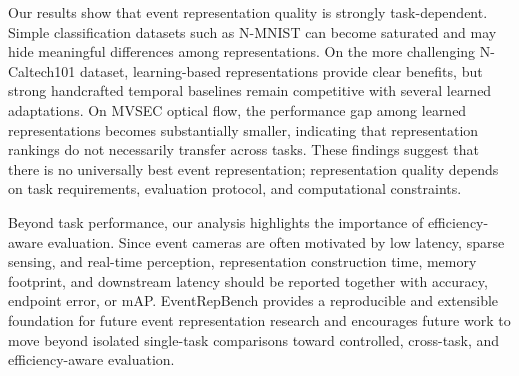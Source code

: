 \documentclass[letterpaper]{article}
\begin{document}
Our results show that event representation quality is strongly task-dependent. Simple classification datasets such as N-MNIST can become saturated and may hide meaningful differences among representations. On the more challenging N-Caltech101 dataset, learning-based representations provide clear benefits, but strong handcrafted temporal baselines remain competitive with several learned adaptations. On MVSEC optical flow, the performance gap among learned representations becomes substantially smaller, indicating that representation rankings do not necessarily transfer across tasks. These findings suggest that there is no universally best event representation; representation quality depends on task requirements, evaluation protocol, and computational constraints.

Beyond task performance, our analysis highlights the importance of efficiency-aware evaluation. Since event cameras are often motivated by low latency, sparse sensing, and real-time perception, representation construction time, memory footprint, and downstream latency should be reported together with accuracy, endpoint error, or mAP. EventRepBench provides a reproducible and extensible foundation for future event representation research and encourages future work to move beyond isolated single-task comparisons toward controlled, cross-task, and efficiency-aware evaluation.


\end{document}
